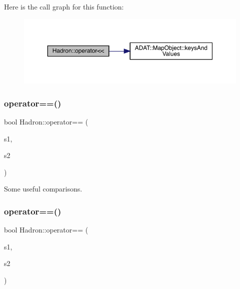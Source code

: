 Here is the call graph for this function\+:
\nopagebreak
\begin{figure}[H]
\begin{center}
\leavevmode
\includegraphics[width=350pt]{d1/daf/namespaceHadron_aa68c7efacb8bc21a4d87aede8544def5_cgraph}
\end{center}
\end{figure}
\mbox{\label{namespaceHadron_a6a6810ed7f262fbb4167534023c0b191}} 
\subsubsection{\texorpdfstring{operator==()}{operator==()}\hspace{0.1cm}{\footnotesize\ttfamily [1/5]}}
{\footnotesize\ttfamily bool Hadron\+::operator== (\begin{DoxyParamCaption}\item[{const \mbox{\hyperlink{structHadron_1_1QuarkNum__t}{Quark\+Num\+\_\+t}} \&}]{s1,  }\item[{const \mbox{\hyperlink{structHadron_1_1QuarkNum__t}{Quark\+Num\+\_\+t}} \&}]{s2 }\end{DoxyParamCaption})}



Some useful comparisons. 

\mbox{\label{namespaceHadron_a89bb389d765cff67405fdb2d27b9b289}} 
\subsubsection{\texorpdfstring{operator==()}{operator==()}\hspace{0.1cm}{\footnotesize\ttfamily [2/5]}}
{\footnotesize\ttfamily bool Hadron\+::operator== (\begin{DoxyParamCaption}\item[{const \mbox{\hyperlink{structHadron_1_1HadronAdjMapTarget__t}{Hadron\+Adj\+Map\+Target\+\_\+t}} \&}]{s1,  }\item[{const \mbox{\hyperlink{structHadron_1_1HadronAdjMapTarget__t}{Hadron\+Adj\+Map\+Target\+\_\+t}} \&}]{s2 }\end{DoxyParamCaption})}



